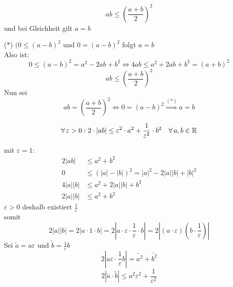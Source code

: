 \documentclass[../ana1u.tex]{subfiles}
\begin{document}
\begin{kor}
    \[ab \leq \left(\frac{a+b}{2}\right)^2\]
    und bei Gleichheit gilt \(a = b\)
\end{kor}
\begin{bew}
    (\(\ast\)) \((0 \leq (a-b)^2\) und \(0 = (a-b)^2\) folgt \(a = b\)\\
    Also ist:
    \[0 \leq (a-b)^2 = a^2 - 2ab + b^2 \Leftrightarrow 4ab \leq a^2 +2ab + b^2 = (a+b)^2\]
    \[ab \leq \left(\frac{a+b}{2}\right)^2\]
    Nun sei
    \[ab = \left(\frac{a+b}{2}\right)^2 \Leftrightarrow 0 = (a-b)^2 
    \overset{(\ast)}{\Rightarrow} a = b\]
\end{bew}
\begin{satz}
    \[\forall \, \varepsilon > 0: 2 \cdot |ab| \leq \varepsilon^2 \cdot a^2 
    + \frac{1}{\varepsilon^2} \cdot b^2 \quad \forall \, a,b \in \mathbb{R}\]
\end{satz}
\begin{bew}
    mit \(\varepsilon = 1\):
    \begin{align*}
        2|ab| &\leq a^2 + b^2\\
        0 &\leq (|a| - |b|)^2 = |a|^2 - 2|a||b| + |b|^2\\
        4|a||b| &\leq a^2 + 2|a||b| + b^2\\
        2|a||b| &\leq a^2 + b^2
    \end{align*}
    \(\varepsilon > 0\) deshalb existiert \(\frac{1}{\varepsilon}\)\\
    somit 
    \[2|a||b| = 2|a \cdot 1 \cdot b| = 2|a \cdot \varepsilon \cdot \frac{1}{\varepsilon} 
    \cdot b| = 2|(a \cdot \varepsilon)(b \cdot \frac{1}{\varepsilon})|\]
    Sei \(\tilde{a} = a\varepsilon\) und \(\tilde{b} = \frac{1}{\varepsilon}b\)
    \[2\left|a\varepsilon \cdot \frac{1}{\varepsilon}b\right| = \tilde{a^2} + \tilde{b^2}\]
    \[2|\tilde{a} \cdot \tilde{b}| \leq a^2\varepsilon^2 + \frac{1}{\varepsilon^2}\] 
\end{bew}
\end{document}
